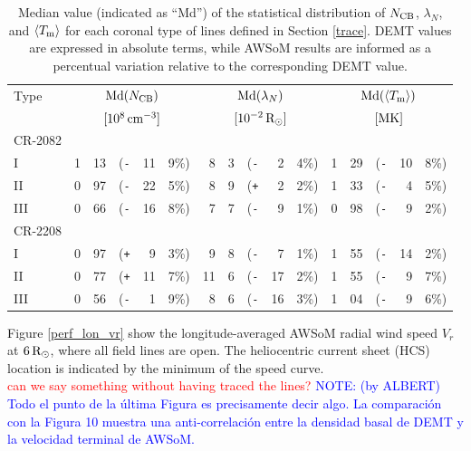 \documentclass[namedreferences]{solarphysics}
\newcommand{\mrsun}{{\rm R_\odot}}
\newcommand{\med}{{\rm Md}}
\newcommand{\avgTe}{\left<\Tm\right>}
\newcommand{\MK}{{\rm MK}}
\newcommand{\lN}{\lambda_N}
\newcommand{\NCB}{N_{\rm CB}}
\newcommand{\Tm}{T_{\rm m}}
\newcommand{\aTm}{\left<\Tm\right>}
\newcommand{\Pl}{\texttt{+}}
\newcommand{\Mi}{\texttt{-}}
\def\diego#1{\textcolor{red}{#1}}
\def\notebyalbert#1{\textcolor{blue}{NOTE: #1}}
\begin{document}
\begin{article}
\begin{table}
\begin{tabular}{l r@{.}l@{\hskip 0.05in} r@{\hskip 0.01in} r@{.}l  r@{.}l@{\hskip 0.05in} r@{\hskip 0.01in} r@{.}l r@{.}l@{\hskip 0.05in} r@{\hskip 0.01in} r@{.}l }
\hline
Type    & \multicolumn{5}{c}{$\med(\NCB)$}             & \multicolumn{5}{c}{$\med(\lN)$} & \multicolumn{5}{c}{$\med(\avgTe)$} \\
       & \multicolumn{5}{c}{$[10^8\,{\rm cm}^{-3}]$}  & \multicolumn{5}{c}{$[{\rm 10}^{-2}\,\mrsun]$} & \multicolumn{5}{c}{$[\MK]$} \\
\hline
CR-2082\\
I  & 1&13 &(\Mi&11&9\%)  &   8&3 &(\Mi&~2&4\%) &   1&29 &(\Mi&10&8\%) \\
II  & 0&97 &(\Mi&22&5\%)  &   8&9 &(\Pl&~2&2\%) &   1&33 &(\Mi&~4&5\%) \\
III  & 0&66 &(\Mi&16&8\%)  &   7&7 &(\Mi&~9&1\%) &   0&98 &(\Mi&~9&2\%) \\
\hline          
CR-2208\\
I  & 0&97 &(\Pl&~9&3\%)  &   9&8 &(\Mi&~7&1\%) &   1&55 &(\Mi&14&2\%) \\
II  & 0&77 &(\Pl&11&7\%)  &  11&6 &(\Mi&17&2\%) &   1&55 &(\Mi&~9&7\%) \\
III  & 0&56 &(\Mi&~1&9\%)  &   8&6 &(\Mi&16&3\%) &   1&04 &(\Mi&~9&6\%) \\
\end{tabular}
\caption{Median value (indicated as ``Md'') of the statistical distribution of $\NCB$, $\lN$, and $\aTm$ for each coronal type of lines defined in Section \ref{trace}. DEMT values are expressed in absolute terms, while AWSoM results are informed as a percentual variation relative to the corresponding DEMT value.}
\label{tabla_comp}
\end{table}






Figure \ref{perf_lon_vr} show the longitude-averaged AWSoM radial wind speed $V_r$ at $6\,\mrsun$, where all field lines are open. The heliocentric current sheet (HCS) location is indicated by the minimum of the speed curve.\\
\diego{can we say something without having traced the lines?} \notebyalbert{(by ALBERT) Todo el punto de la última Figura es precisamente decir algo. La comparación con la Figura 10 muestra una anti-correlación entre la densidad basal de DEMT y la velocidad terminal de AWSoM.}


\end{article}
\end{document}
